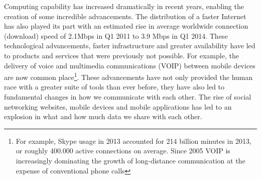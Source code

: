 \documentclass[twocolumn,english]{article}
\begin{document}
Computing capability has increased dramatically in recent years, enabling
the creation of some incredible advancements. %
The distribution of a faster Internet has also played its part with an estimated rise in average worldwide connection (download)
speed of 2.1Mbps in Q1 2011 to 3.9 Mbps in Q1 2014\cite{statisticaInternet14}.
These technological advancements, faster infrastructure and greater
availability have led to products and services that were previously
not possible. For example, the delivery of voice and multimedia communications
(VOIP) between mobile devices are now common place\footnote{For example, Skype usage in 2013 accounted for 214 billion minutes in 2013\cite{nay14}, or roughly 400.000 active connections on average. Since 2005 VOIP is increasingly dominating the growth of long-distance communication at the expense of conventional phone calls\cite{telegeography14}}.
These advancements have not only provided the human race with a greater
suite of tools than ever before, they have also led to fundamental
changes in how we communicate with each other. The rise of social
networking websites, mobile devices and mobile applications has led
to an explosion in what and how much data we share with each other.
\end{document}
